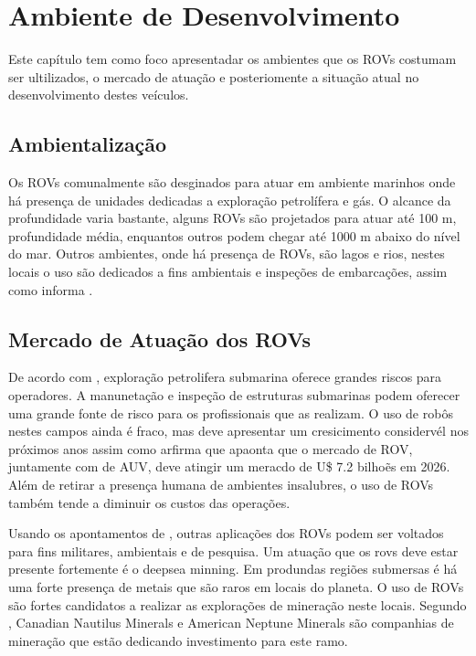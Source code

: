 \chapter{Ambiente de Desenvolvimento}

\label{chap:ambientalizacao}

Este capítulo tem  como foco apresentadar os ambientes que os ROVs costumam ser ultilizados, o mercado de atuação e posteriomente a situação atual no desenvolvimento  destes veículos.

\section{Ambientalização}
Os ROVs comunalmente são desginados para atuar em ambiente marinhos onde há presença de unidades dedicadas a exploração petrolífera e gás. O alcance da profundidade varia bastante, alguns ROVs são projetados para atuar até 100 m, profundidade média, enquantos outros podem chegar até 1000 m abaixo do nível do mar. Outros ambientes, onde há presença de ROVs, são lagos e rios, nestes locais o uso são dedicados a fins ambientais e inspeções de embarcações, assim como informa \cite{CBS}.  


\section{Mercado de Atuação dos ROVs}


De acordo com \cite{Bogue1}, exploração petrolifera submarina oferece grandes riscos para operadores. A manunetação e inspeção de estruturas submarinas podem oferecer uma grande fonte de risco para os profissionais que as realizam. O uso de robôs nestes campos ainda é fraco, mas deve apresentar um cresicimento considervél nos próximos anos assim como arfirma \cite{yahoo_finaces}  que apaonta que o mercado de ROV, juntamente com de AUV, deve atingir um meracdo de U\$ 7.2 bilhoẽs em 2026. Além de retirar a presença humana de ambientes insalubres,  o uso de ROVs também tende a diminuir os custos das operações.

Usando os apontamentos de \cite{Bogue2}, outras aplicações dos ROVs podem ser voltados para fins militares, ambientais e de pesquisa. Um atuação que os rovs deve estar presente fortemente é o deepsea minning. Em produndas regiões submersas é há uma forte presença de metais que são raros em locais do planeta. O uso de ROVs são fortes candidatos a realizar as explorações de mineração neste locais. Segundo \cite{Bogue2}, Canadian Nautilus Minerals e American Neptune Minerals são companhias de mineração que estão dedicando investimento para este ramo.


